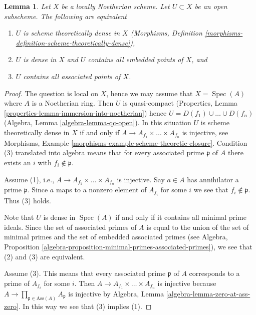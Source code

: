 \documentclass[10pt,a4paper]{amsart}
\theoremstyle{plain}
\newtheorem{lemma}[subsection]{Lemma}
\theoremstyle{definition}
\theoremstyle{remark}
\numberwithin{equation}{subsection}
\def\Spec{\mathop{\mathrm{Spec}}}
\begin{document}
\begin{lemma}
\label{lemma-scheme-theoretically-dense-contain-embedded-points}
Let $X$ be a locally Noetherian scheme. Let $U \subset X$ be an
open subscheme. The following are equivalent
\begin{enumerate}
\item $U$ is scheme theoretically dense in $X$
(Morphisms, Definition \ref{morphisms-definition-scheme-theoretically-dense}),
\item $U$ is dense in $X$ and $U$ contains all embedded points of $X$, and
\item $U$ contains all associated points of $X$.
\end{enumerate}
\end{lemma}

\begin{proof}
The question is local on $X$, hence we may assume that $X = \Spec(A)$
where $A$ is a Noetherian ring. Then $U$ is quasi-compact
(Properties, Lemma \ref{properties-lemma-immersion-into-noetherian})
hence $U = D(f_1) \cup \ldots \cup D(f_n)$
(Algebra, Lemma \ref{algebra-lemma-qc-open}).
In this situation $U$ is scheme theoretically dense in $X$ if and only if
$A \to A_{f_1} \times \ldots \times A_{f_n}$ is injective, see
Morphisms, Example \ref{morphisms-example-scheme-theoretic-closure}.
Condition (3) translated into algebra means that for every associated
prime $\mathfrak p$ of $A$ there exists an $i$ with $f_i \not \in \mathfrak p$.

\medskip\noindent
Assume (1), i.e., $A \to A_{f_1} \times \ldots \times A_{f_n}$ is injective.
Say $a \in A$ has annihilator a prime $\mathfrak p$. Since $a$ maps
to a nonzero element of $A_{f_i}$ for some $i$ we see that
$f_i \not \in \mathfrak p$. Thus (3) holds.

\medskip\noindent
Note that $U$ is dense in $\Spec(A)$ if and only if it contains all
minimal prime ideals. Since the set of associated primes
of $A$ is equal to the union of the set of minimal primes and the
set of embedded associated primes (see Algebra, Proposition
\ref{algebra-proposition-minimal-primes-associated-primes}),
we see that (2) and (3) are equivalent.

\medskip\noindent
Assume (3). This means that every associated prime $\mathfrak p$ of $A$
corresponds to a prime of $A_{f_i}$ for some $i$. Then
$A \to A_{f_1} \times \ldots \times A_{f_n}$ is injective because
$A \to \prod_{\mathfrak p \in \text{Ass}(A)} A_\mathfrak p$ is injective
by Algebra, Lemma \ref{algebra-lemma-zero-at-ass-zero}. In this way
we see that (3) implies (1).
\end{proof}
\end{document}
